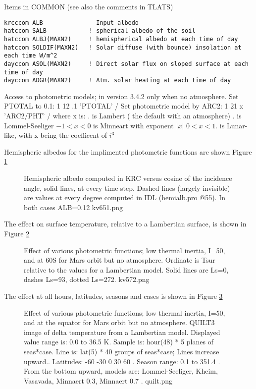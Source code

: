 Items in COMMON (see also the comments in TLATS)
\vspace{-3.mm} 
\begin{verbatim}
krcccom ALB               Input albedo
hatccom SALB            ! spherical albedo of the soil
hatccom ALBJ(MAXN2)     ! hemispherical albedo at each time of day
hatccom SOLDIF(MAXN2)   ! Solar diffuse (with bounce) insolation at each time W/m^2 
dayccom ASOL(MAXN2)     ! Direct solar flux on sloped surface at each time of day
dayccom ADGR(MAXN2)     ! Atm. solar heating at each time of day 
\end{verbatim} 

Access to photometric models; in version 3.4.2 only when no atmosphere.
\qi Set PTOTAL to 0.1:  1 12 .1 'PTOTAL'   /
\qi Set photometric model by ARC2:  1 21 x 'ARC2/PHT' /  where x is: 
. is Lambert ( the default with an atmosphere)
. is Lommel-Seeliger
\qii $-1<x<0$ is Minneart with exponent  $|x|$
\qii   $0<x<1.$ is Lunar-like, with x being the coefficent of $i^3$

Hemispheric albedos for the implimented photometric functions are shown Figure \ref{kv651}  
\begin{figure}[!ht] 
\caption[Test of Photometric functions]{Hemispheric albedo computed in KRC
  versus cosine of the incidence angle, solid lines, at every time step. Dashed
  lines (largely invisible) are values at every degree computed in IDL
  (hemialb.pro @55). In both cases ALB=0.12
\label{kv651}  kv651.png }
\end{figure} 

 The effect on surface temperature, relative to a Lambertian surface, is shown in 
Figure \ref{kv572}  
\begin{figure}[!ht] 
\caption[Effect of Photometric functions]{Effect of various photometric
  functions; low thermal inertia, I=50, and at 60\qd S for Mars orbit but no
  atmosphere. Ordinate is Tsur relative to the values for a Lambertian
  model. Solid lines are Ls=0, dashes Ls=93, dotted Ls=272.
\label{kv572}  kv572.png }
\end{figure} 

The effect at all hours, latitudes, seasons and cases is shown in
Figure \ref{quilt}  
\begin{figure}[!ht] 
\caption[Effect of Photometric functions]{Effect of various photometric functions;
 low thermal inertia, I=50,  and at the equator for Mars orbit but no atmosphere. 
QUILT3 image of delta temperature from a Lambertian model.  Displayed value
range is: 0.0 to 36.5 K.  Sample is: hour(48) * 5 planes of seas*case.  Line is:
lat(5) * 40 groups of seas*case; Lines increase upward..  Latitudes: -60 -30 0
30 60 .  Season range: 0.1 to 351.4 . From the bottom upward, models are:
Lommel-Seeliger, Kheim, Vasavada, Minnaert 0.3, Minnaert 0.7 .
\label{quilt}  quilt.png }
\end{figure} 


